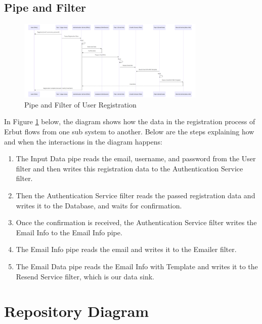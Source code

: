\documentclass[a4paper]{report}
\begin{document}
\section{Pipe and Filter}

\begin{figure}[h!]
    \centering
    \includegraphics[width=0.8\textwidth]{images/data-flow/registration-pipe-and-filter.png}
    \caption{Pipe and Filter of User Registration}
    \label{fig:pip-and-filter-user-registration}
\end{figure}

In Figure \ref{fig:pip-and-filter-user-registration} below, the diagram shows how the data in the registration process of Erbut flows from one sub system to another. Below are the steps explaining how and when the interactions in the diagram happens:

\begin{enumerate}
    \item The Input Data pipe reads the email, username, and password from the User filter and then writes this registration data to the Authentication Service filter.
    \item Then the Authentication Service filter reads the passed registration data and writes it to the Database, and waits for confirmation.
    \item Once the confirmation is received, the Authentication Service filter writes the Email Info to the Email Info pipe.
    \item The Email Info pipe reads the email and writes it to the Emailer filter.
    \item The Email Data pipe reads the Email Info with Template and writes it to the Resend Service filter, which is our data sink.
\end{enumerate}

\chapter{Repository Diagram}
\end{document}
